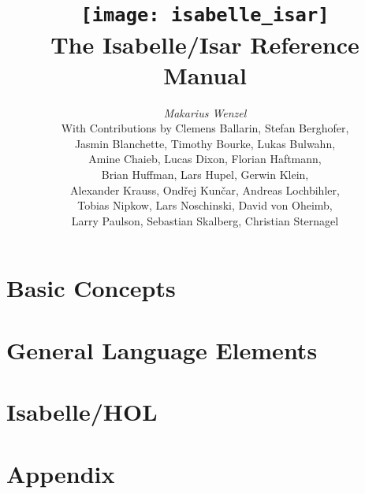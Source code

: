 \documentclass[12pt,a4paper,fleqn]{report}
\title{\texttt{[image: isabelle\_isar]} \\[4ex] The Isabelle/Isar Reference Manual}
\author{\emph{Makarius Wenzel} \\[3ex]
  With Contributions by
  Clemens Ballarin,
  Stefan Berghofer, \\
  Jasmin Blanchette,
  Timothy Bourke,
  Lukas Bulwahn, \\
  Amine Chaieb,
  Lucas Dixon,
  Florian Haftmann, \\
  Brian Huffman,
  Lars Hupel,
  Gerwin Klein, \\
  Alexander Krauss,
  Ond\v{r}ej Kun\v{c}ar,
  Andreas Lochbihler, \\
  Tobias Nipkow,
  Lars Noschinski,
  David von Oheimb, \\
  Larry Paulson,
  Sebastian Skalberg,
  Christian Sternagel
}
\let\intorig=\int  %
\begin{document}
\maketitle 

{\def\isamarkupchapter#1{\chapter*{#1}}}
\tableofcontents
\clearfirst

\part{Basic Concepts}



\part{General Language Elements}







\part{Isabelle/HOL}\label{part:hol}


\part{Appendix}
\appendix

\let\int\intorig



\begingroup
  \tocentry{\bibname}
   \small\raggedright\frenchspacing
  
\endgroup

\tocentry{\indexname}
\printindex
\end{document}
